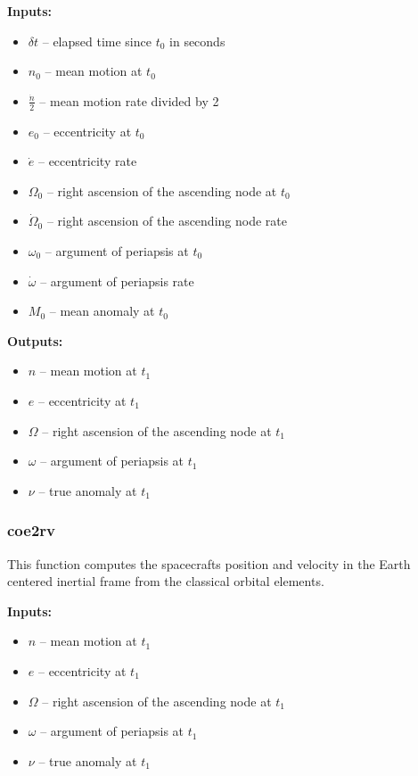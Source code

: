 \documentclass[11pt, reqno]{article}    %
\begin{document}
\noindent \textbf{Inputs: }
\begin{itemize}
    \item \( \delta t \) -- elapsed time since \( t_0 \) in seconds
    \item \( n_0 \) -- mean motion at \( t_0 \)
    \item \( \frac{\dot{n}}{2} \) -- mean motion rate divided by 2
    \item \( e_0 \) -- eccentricity at \( t_0 \)
    \item \( \dot{e} \) -- eccentricity rate
    \item \( \Omega_0 \) -- right ascension of the ascending node at \( t_0 \)
    \item \( \dot{\Omega}_0 \) -- right ascension of the ascending node rate
    \item \( \omega_0 \) -- argument of periapsis at \( t_0 \)
    \item \( \dot{\omega} \) -- argument of periapsis rate
    \item \( M_0 \) -- mean anomaly at \( t_0 \)
\end{itemize}

\noindent \textbf{Outputs:}

\begin{itemize}
    \item \( n \) -- mean motion at \( t_1 \)
    \item \( e \) -- eccentricity at \( t_1 \)
    \item \( \Omega \) -- right ascension of the ascending node at \( t_1 \)
    \item \( \omega \) -- argument of periapsis at \( t_1 \)
    \item \( \nu \) -- true anomaly at \( t_1 \)
\end{itemize}

\subsubsection*{\textbf{coe2rv}}
This function computes the spacecrafts position and velocity in the Earth centered inertial frame from the classical orbital elements.

\noindent \textbf{Inputs: }
\begin{itemize}
    \item \( n \) -- mean motion at \( t_1 \)
    \item \( e \) -- eccentricity at \( t_1 \)
    \item \( \Omega \) -- right ascension of the ascending node at \( t_1 \)
    \item \( \omega \) -- argument of periapsis at \( t_1 \)
    \item \( \nu \) -- true anomaly at \( t_1 \)
\end{itemize}
\end{document}
